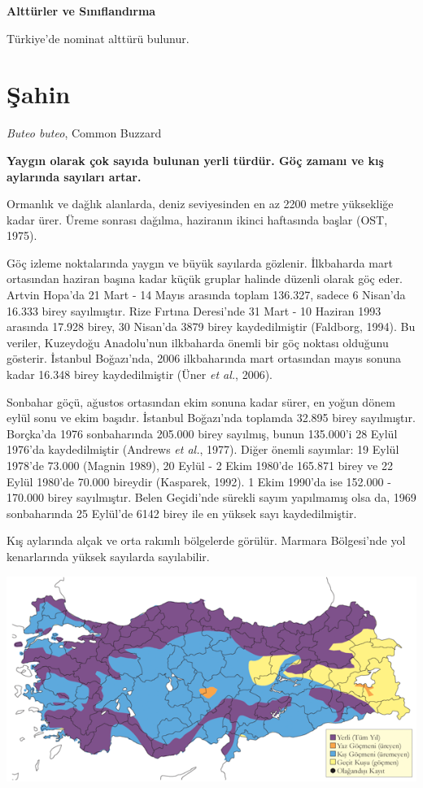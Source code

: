 \documentclass[
  a4paper,
  DIV=11,
  numbers=noendperiod]{scrreprt}
\begin{document}
\textbf{Alttürler ve Sınıflandırma}

Türkiye'de nominat alttürü bulunur.

\section{Şahin}\label{ux15fahin}

\emph{Buteo buteo}, Common Buzzard

\textbf{Yaygın olarak çok sayıda bulunan yerli türdür. Göç zamanı ve kış
aylarında sayıları artar.}

Ormanlık ve dağlık alanlarda, deniz seviyesinden en az 2200 metre
yüksekliğe kadar ürer. Üreme sonrası dağılma, haziranın ikinci
haftasında başlar (OST, 1975).

Göç izleme noktalarında yaygın ve büyük sayılarda gözlenir. İlkbaharda
mart ortasından haziran başına kadar küçük gruplar halinde düzenli
olarak göç eder. Artvin Hopa'da 21 Mart - 14 Mayıs arasında toplam
136.327, sadece 6 Nisan'da 16.333 birey sayılmıştır. Rize Fırtına
Deresi'nde 31 Mart - 10 Haziran 1993 arasında 17.928 birey, 30 Nisan'da
3879 birey kaydedilmiştir (Faldborg, 1994). Bu veriler, Kuzeydoğu
Anadolu'nun ilkbaharda önemli bir göç noktası olduğunu gösterir.
İstanbul Boğazı'nda, 2006 ilkbaharında mart ortasından mayıs sonuna
kadar 16.348 birey kaydedilmiştir (Üner \emph{et al.}, 2006).

Sonbahar göçü, ağustos ortasından ekim sonuna kadar sürer, en yoğun
dönem eylül sonu ve ekim başıdır. İstanbul Boğazı'nda toplamda 32.895
birey sayılmıştır. Borçka'da 1976 sonbaharında 205.000 birey sayılmış,
bunun 135.000'i 28 Eylül 1976'da kaydedilmiştir (Andrews \emph{et al.},
1977). Diğer önemli sayımlar: 19 Eylül 1978'de 73.000 (Magnin 1989), 20
Eylül - 2 Ekim 1980'de 165.871 birey ve 22 Eylül 1980'de 70.000 bireydir
(Kasparek, 1992). 1 Ekim 1990'da ise 152.000 - 170.000 birey
sayılmıştır. Belen Geçidi'nde sürekli sayım yapılmamış olsa da, 1969
sonbaharında 25 Eylül'de 6142 birey ile en yüksek sayı kaydedilmiştir.

Kış aylarında alçak ve orta rakımlı bölgelerde görülür. Marmara
Bölgesi'nde yol kenarlarında yüksek sayılarda sayılabilir.

\includegraphics{images/harita_Page_111.png}
\end{document}
